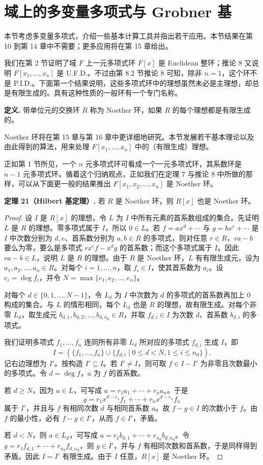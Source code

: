 \section{域上的多变量多项式与 Grobner 基}

本节考虑多变量多项式，介绍一些基本计算工具并指出若干应用。本节结果在第 10 到第 14 章中不需要；更多应用将在第 15 章给出。

我们在第 2 节证明了域 $F$ 上一元多项式环 $F[x]$ 是 Euclidean 整环；推论 8 又说明 $F[x_1,\ldots,x_n]$ 是 U.F.D.。不过由第 8.2 节推论 8 可知，除非 $n=1$，这个环不是 P.I.D.。下面第一个结果说明，这些多项式环中的理想虽然未必是主理想，却总是有限生成的。具有这种性质的一般环有一个专门名称。

\noindent\textbf{定义.} 带单位元的交换环 $R$ 称为 Noether 环，如果 $R$ 的每个理想都是有限生成的。

Noether 环将在第 15 章与第 16 章中更详细地研究。本节发展若干基本理论以及由此得到的算法，用来处理 $F[x_1,\ldots,x_n]$ 中的（有限生成）理想。

正如第 1 节所见，一个 $n$ 元多项式环可看成一个一元多项式环，其系数环是 $n-1$ 元多项式环。循着这个归纳观点，正如我们在定理 7 与推论 8 中所做的那样，可以从下面更一般的结果推出 $F[x_1,x_2,\ldots,x_n]$ 是 Noether 环。

\noindent\textbf{定理 21（Hilbert 基定理）.} 若 $R$ 是 Noether 环，则 $R[x]$ 也是 Noether 环。

\begin{proof}
	设 $I$ 是 $R[x]$ 的理想，令 $L$ 为 $I$ 中所有元素的首系数组成的集合。先证明 $L$ 是 $R$ 的理想。零多项式属于 $I$，所以 $0\in L$。若 $f=ax^d+\cdots$ 与 $g=bx^e+\cdots$ 是 $I$ 中次数分别为 $d,e$、首系数分别为 $a,b\in R$ 的多项式，则对任意 $r\in R$，$ra-b$ 要么为零，要么是多项式 $r x^e f-x^d g$ 的首系数；而这个多项式属于 $I$。因此 $ra-b\in L$，说明 $L$ 是 $R$ 的理想。由于 $R$ 是 Noether 环，$L$ 有有限生成元，设为 $a_1,a_2,\ldots,a_n\in R$。对每个 $i=1,\ldots,n$，取 $f_i\in I$，使其首系数为 $a_i$。设 $e_i=\deg f_i$，并令 $N=\max\{e_1,e_2,\ldots,e_n\}$。

	对每个 $d\in\{0,1,\ldots,N-1\}$，令 $L_d$ 为 $I$ 中次数为 $d$ 的多项式的首系数再加上 $0$ 构成的集合。与 $L$ 的情形相同，每个 $L_d$ 也是 $R$ 的理想，故有限生成。对每个非零 $L_d$，取生成元 $b_{d,1},b_{d,2},\ldots,b_{d,n_d}\in R$，并取 $f_{d,i}\in I$ 为次数 $d$、首系数 $b_{d,i}$ 的多项式。

	我们证明多项式 $f_1,\ldots,f_n$ 连同所有非零 $L_d$ 所对应的多项式 $f_{d,i}$ 生成 $I$，即
\[
I=(\{f_1,\ldots,f_n\}\cup\{f_{d,i}\mid 0\leq d<N,
1\leq i\leq n_d\}).
\]
记右边理想为 $I'$。按构造 $I'\subseteq I$。若 $I'\neq I$，则可取 $f\in I-I'$ 为非零且次数最小的多项式。令 $d=\deg f$，$a$ 为 $f$ 的首系数。

	若 $d\geq N$，因为 $a\in L$，可写成 $a=r_1a_1+\cdots+r_na_n$。于是
\[
g=r_1x^{d-e_1}f_1+\cdots+r_nx^{d-e_n}f_n
\]
属于 $I'$，并且与 $f$ 有相同次数 $d$ 与相同首系数 $a$。故 $f-g\in I$ 的次数小于 $f$。由 $f$ 的最小性，必有 $f-g\in I'$，从而 $f\in I'$，矛盾。

	若 $d<N$，则 $a\in L_d$，可写成 $a=r_1b_{d,1}+\cdots+r_{n_d}b_{d,n_d}$。令 $g=r_1f_{d,1}+\cdots+r_{n_d}f_{d,n_d}$，则 $g\in I'$，并与 $f$ 有相同次数和首系数，于是同样得到矛盾。因此 $I=I'$ 有限生成。由于 $I$ 任意，$R[x]$ 是 Noether 环。
\end{proof}


